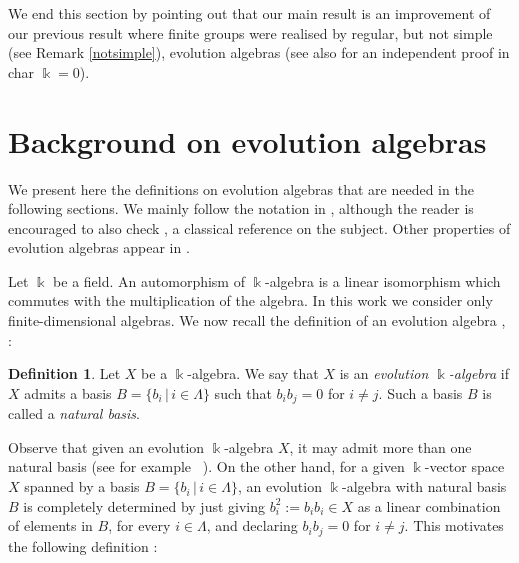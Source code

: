 \documentclass[a4paper,12pt]{amsart}
\theoremstyle{definition}
\newtheorem{definition}[theorem]{Definition}
\theoremstyle{remark}
\newcommand{\A}{\mathcal{A}}
\begin{document}
We end this section by pointing out that our main result is an improvement of our previous result \cite[Theorem 1.1]{CLTV} where finite groups were realised by regular, but not simple (see Remark \ref{notsimple}), evolution algebras (see also \cite{chinos} for an independent proof in char $\Bbbk =0$).







\section{Background on evolution algebras}\label{sec:evolution}

We present here the definitions on evolution algebras that are needed in the following sections. We mainly follow the notation in \cite{Tesis-Yolanda}, although the reader is encouraged to also check \cite{Tian}, a classical reference on the subject. Other properties of evolution algebras appear in \cite{extra3,extra1,extra2}.


Let $\Bbbk$ be a field. 
An automorphism of $\Bbbk$-algebra is a linear isomorphism which commutes with the multiplication
of the algebra. In this work we consider only finite-dimensional algebras.
We now recall the definition of an evolution algebra \cite[Definition 1]{Tian}, \cite[Definitions 1.2.1]{Tesis-Yolanda}:

\begin{definition}\label{def:evolution}
Let %
$X$ be a $\Bbbk$-algebra. We say that $X$ is an \textit{evolution $\Bbbk$-algebra} if  $X$ admits a  basis $B = \{b_i\, |\, i \in \Lambda\}$ such that $b_i b_j = 0$ for $i\neq j$. Such a basis $B$ is called a \textit{natural basis}.
\end{definition}

Observe that given an evolution $\Bbbk$-algebra $X$, it may admit more than one natural basis (see for example \ \cite[Example 1.6.3]{Tesis-Yolanda}). On the other hand, for a given $\Bbbk$-vector space $X$ spanned by a basis $B = \{b_i\, |\, i \in \Lambda\}$,  an evolution  $\Bbbk$-algebra with natural basis $B$ is completely determined by just giving $b_i^2:=b_i b_i\in X$ as  a linear combination of elements in $B$, for every $i\in\Lambda$, and declaring  $b_ib_j=0$ for $i \neq j$. This motivates the following definition \cite[Definition 1.2.1]{Tesis-Yolanda}:
\end{document}
